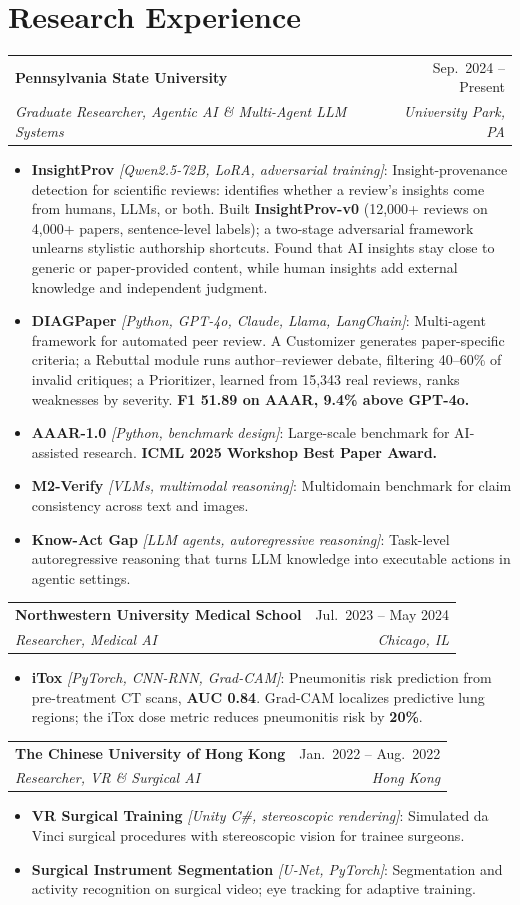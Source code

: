 \documentclass[letterpaper,10pt]{article}
\makeatletter
\newcommand{\entry}[4]{%
  \begin{tabular*}{\textwidth}{@{}l@{\extracolsep{\fill}}r@{}}
    \textbf{#1} & \small #2 \\
    \small\textit{#3} & \small\textit{#4}
  \end{tabular*}\par\vspace{1pt}}
\newenvironment{cvlist}
  {\begin{itemize}[leftmargin=0.16in, label=\textbullet, itemsep=2pt, parsep=0pt, topsep=2pt]\small}
  {\end{itemize}\vspace{3pt}}
\newcommand{\proj}[3]{\item \textbf{#1} \textit{[#2]}: #3}
\makeatother
\begin{document}
\section{Research Experience}

\entry{Pennsylvania State University}{Sep.\ 2024 -- Present}{Graduate Researcher, Agentic AI \& Multi-Agent LLM Systems}{University Park, PA}
\begin{cvlist}
  \proj{InsightProv}{Qwen2.5-72B, LoRA, adversarial training}{Insight-provenance detection for scientific reviews: identifies whether a review's insights come from humans, LLMs, or both. Built \textbf{InsightProv-v0} (12,000+ reviews on 4,000+ papers, sentence-level labels); a two-stage adversarial framework unlearns stylistic authorship shortcuts. Found that AI insights stay close to generic or paper-provided content, while human insights add external knowledge and independent judgment.}
  \proj{DIAGPaper}{Python, GPT-4o, Claude, Llama, LangChain}{Multi-agent framework for automated peer review. A Customizer generates paper-specific criteria; a Rebuttal module runs author--reviewer debate, filtering 40--60\% of invalid critiques; a Prioritizer, learned from 15,343 real reviews, ranks weaknesses by severity. \textbf{F1 51.89 on AAAR, 9.4\% above GPT-4o.}}
  \proj{AAAR-1.0}{Python, benchmark design}{Large-scale benchmark for AI-assisted research. \textbf{ICML 2025 Workshop Best Paper Award.}}
  \proj{M2-Verify}{VLMs, multimodal reasoning}{Multidomain benchmark for claim consistency across text and images.}
  \proj{Know-Act Gap}{LLM agents, autoregressive reasoning}{Task-level autoregressive reasoning that turns LLM knowledge into executable actions in agentic settings.}
\end{cvlist}

\entry{Northwestern University Medical School}{Jul.\ 2023 -- May 2024}{Researcher, Medical AI}{Chicago, IL}
\begin{cvlist}
  \proj{iTox}{PyTorch, CNN-RNN, Grad-CAM}{Pneumonitis risk prediction from pre-treatment CT scans, \textbf{AUC 0.84}. Grad-CAM localizes predictive lung regions; the iTox dose metric reduces pneumonitis risk by \textbf{20\%}.}
\end{cvlist}

\entry{The Chinese University of Hong Kong}{Jan.\ 2022 -- Aug.\ 2022}{Researcher, VR \& Surgical AI}{Hong Kong}
\begin{cvlist}
  \proj{VR Surgical Training}{Unity C\#, stereoscopic rendering}{Simulated da Vinci surgical procedures with stereoscopic vision for trainee surgeons.}
  \proj{Surgical Instrument Segmentation}{U-Net, PyTorch}{Segmentation and activity recognition on surgical video; eye tracking for adaptive training.}
\end{cvlist}
\end{document}
